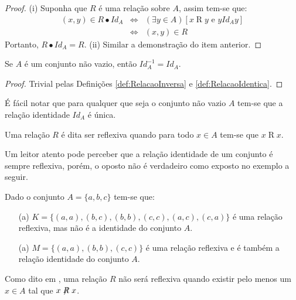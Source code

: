 \begin{proof}
	(i) Suponha que $R$ é uma relação sobre $A$, assim tem-se que:
	\begin{eqnarray*}
		(x, y) \in R \bullet Id_A  & \Longleftrightarrow & (\exists y \in A)[x \mathrel{R} y \text{ e } y \mathrel{Id_A} y]\\
		& \Longleftrightarrow & (x, y) \in R 
	\end{eqnarray*}
	Portanto,  $R \bullet Id_A = R$. (ii) Similar a demonstração do item anterior.
\end{proof}

\begin{proposition}\label{prop:ComplementarDaRelacaoIdentica}
	Se $A$ é um conjunto não vazio, então $Id_A^{-1} = Id_A$.
\end{proposition}

\begin{proof}
	Trivial pelas Definições \ref{def:RelacaoInversa} e \ref{def:RelacaoIdentica}.
\end{proof}

\begin{remark}\label{rema:UnicidadeDaRelacaoIdentica}
	É fácil notar que para qualquer que seja o conjunto não vazio $A$ tem-se que a relação identidade $Id_A$ é única.
\end{remark}

\begin{definition}\label{def:RelacaoReflexiva}
	Uma relação $R$ é dita ser reflexiva quando para todo $x \in A$ tem-se que $x \mathrel{R} x$.
\end{definition}

Um leitor atento pode perceber que a relação identidade de um conjunto é sempre reflexiva, porém, o oposto não é verdadeiro como exposto no exemplo a seguir.

\begin{example}
	Dado o conjunto $A = \{a, b, c\}$ tem-se que: 
	\begin{itemize}
		\item[(a)] $K = \{(a, a), (b, c), (b, b), (c, c), (a, c), (c, a)\}$ é uma relação reflexiva, mas não é a identidade do conjunto $A$.
		\item[(a)] $M = \{(a, a), (b, b), (c, c) \}$ é uma relação reflexiva e é  também a relação identidade do conjunto $A$.
	\end{itemize}
\end{example}

Como dito em \cite{abe1991-TC}, uma relação $R$ não será reflexiva quando existir pelo menos um $x \in A$ tal que $x\centernot{R} x$.

